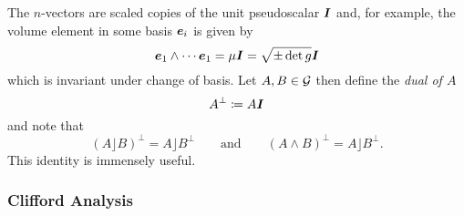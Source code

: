 \documentclass{article}
\begin{document}
The $n$-vectors are scaled copies of the unit pseudoscalar $\boldsymbol{I}$ and, for example, the volume element in some basis $\boldsymbol{e}_i$ is given by
\begin{equation}
    \boldsymbol{e}_1 \wedge \cdots \boldsymbol{e}_1 = \mu \boldsymbol{I} = \sqrt{\pm \det g} \boldsymbol{I}
\end{equation}
which is invariant under change of basis. Let $A, B \in \mathcal{G}$ then define the \emph{dual of $A$}
\begin{equation}
A^\perp \coloneqq A\boldsymbol{I}
\end{equation}
and note that
\begin{equation}
(A\rfloor B)^\perp = A\rfloor B^\perp \qquad \textrm{and}\qquad (A\wedge B)^\perp = A\rfloor B^\perp.
\end{equation}
This identity is immensely useful.


\subsubsection{Clifford Analysis}
\end{document}
